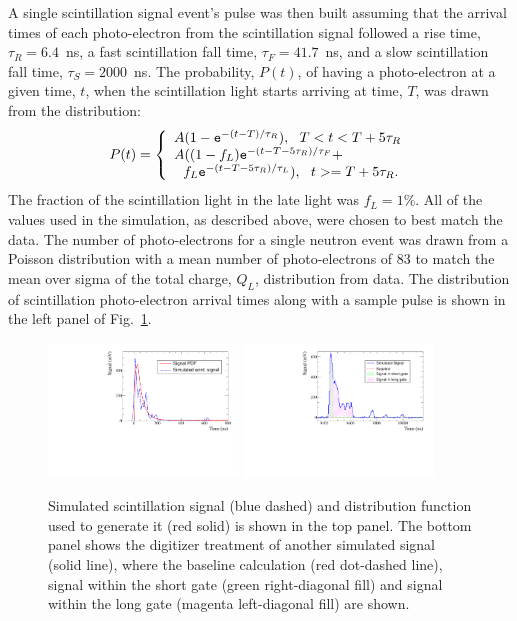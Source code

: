 \documentclass[twocolumn]{bmcart}
\begin{document}
A single scintillation signal event's pulse was then built assuming
that the arrival times of each photo-electron from the scintillation
signal followed a rise time, $\tau_R=6.4$~ns, a fast scintillation
fall time, $\tau_F=41.7$~ns, and a slow scintillation fall time,
$\tau_S=2000$~ns.  The probability, $P(t)$, of having a photo-electron
at a given time, $t$, when the scintillation light starts arriving at
time, $T$, was drawn from the distribution:
\begin{equation}
  P(t) = \left\{
    \begin{array}{l}
      A ( 1 - {\tt e}^{-(t-T)/\tau_R } ),\ \ T<t<T+5\tau_R \\
      A ( (1-f_L) {\tt e}^{ -(t-T-5\tau_R)/\tau_F } +   \\
      \ \ f_L {\tt e}^{ -(t-T-5\tau_R)/\tau_L } ),\ \  t>=T+5\tau_R.
    \end{array}
    \right.
\end{equation}
The fraction of the scintillation light in the late light was
$f_L=1$\%.  All of the values used in the simulation, as described
above, were chosen to best match the data.  The number of
photo-electrons for a single neutron event was drawn from a Poisson
distribution with a mean number of photo-electrons of 83 to match the
mean over sigma of the total charge, $Q_L$, distribution from data.
The distribution of scintillation photo-electron arrival times along
with a sample pulse is shown in the left panel of
Fig.~\ref{fig:signalpdf}.

\begin{figure}[!htpb]
\centering
\includegraphics[width=0.45\textwidth]{figures/signalpulse.pdf}
\includegraphics[width=0.45\textwidth]{figures/digisimexample.pdf}
\caption{ Simulated scintillation signal (blue dashed) and
  distribution function used to generate it (red solid) is shown in
  the top panel.  The bottom panel shows the digitizer treatment of
  another simulated signal (solid line), where the baseline
  calculation (red dot-dashed line), signal within the short gate
  (green right-diagonal fill) and signal within the long gate (magenta
  left-diagonal fill) are shown.}\label{fig:signalpdf}
\end{figure}
\end{document}

